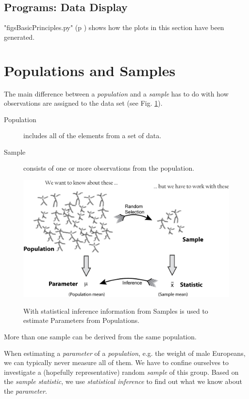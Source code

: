 \subsection{Programs: Data Display}
\PyImg "figsBasicPrinciples.py" (p \pageref{py:BasicPrinciples}) shows how the plots in this section have been generated.

\section{Populations and Samples}

The main difference between a \emph{population} and a \emph{sample} has to do with how observations are assigned to the data set (see Fig. \ref{fig:population}).

\begin{description}
  \item[Population] includes all of the elements from a set of data.
  \item[Sample] consists of one or more observations from the population.
\end{description}

\begin{figure}
  \centering
  \includegraphics[width=1.0\textwidth]{../Images/PopulationAndSample.jpg}\\
  \caption{With statistical inference information from Samples is used to estimate Parameters from Populations.}\label{fig:population}
\end{figure}

More than one sample can be derived from the same population.

When estimating a \emph{parameter} of a \emph{population}, e.g. the weight of male Europeans, we can typically never measure all of them. We have to confine ourselves to investigate a (hopefully representative) random \emph{sample} of this group. Based on the \emph{sample statistic}, we use \emph{statistical inference} to find out what we know about the \emph{parameter}.

